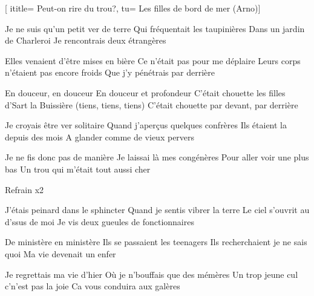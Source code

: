  [
ititle= {Peut-on rire du trou?},
tu= {Les filles de bord de mer (Arno)}]


\beginverse
Je ne suis qu'un petit ver de terre
Qui fréquentait les taupinières
Dans un jardin de Charleroi
Je rencontrais deux étrangères
\endverse

\beginverse
Elles venaient d'être mises en bière
Ce n'était pas pour me déplaire
Leurs corps n'étaient pas encore froids
Que j'y pénétrais par derrière
\endverse

\beginchorus
En douceur, en douceur
En douceur et profondeur
C'était chouette les filles d'Sart la Buissière
(tiens, tiens, tiens)
C'était chouette par devant, par derrière
\endchorus

\beginverse
Je croyais être ver solitaire
Quand j'aperçus quelques confrères
Ils étaient la depuis des mois
A glander comme de vieux pervers
\endverse

\beginverse
Je ne fis donc pas de manière
Je laissai là mes congénères
Pour aller voir une plus bas
Un trou qui m'était tout aussi cher
\endverse

\beginchorus
Refrain x2
\endchorus

\beginverse
J'étais peinard dans le sphincter
Quand je sentis vibrer la terre
Le ciel s'ouvrit au d'ssus de moi
Je vis deux gueules de fonctionnaires
\endverse

\beginverse
De ministère en ministère
Ils se passaient les teenagers
Ils recherchaient je ne sais quoi
Ma vie devenait un enfer
\endverse

\beginverse
Je regrettais ma vie d'hier
Où je n'bouffais que des mémères
Un trop jeune cul c'n'est pas la joie
Ca vous conduira aux galères
\endverse

\endsong